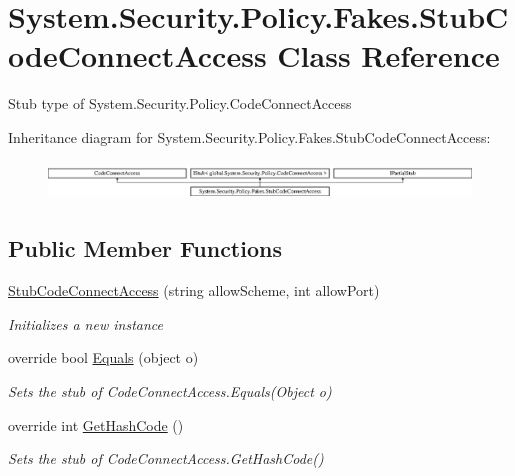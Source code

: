 \hypertarget{class_system_1_1_security_1_1_policy_1_1_fakes_1_1_stub_code_connect_access}{\section{System.\-Security.\-Policy.\-Fakes.\-Stub\-Code\-Connect\-Access Class Reference}
\label{class_system_1_1_security_1_1_policy_1_1_fakes_1_1_stub_code_connect_access}
}


Stub type of System.\-Security.\-Policy.\-Code\-Connect\-Access 


Inheritance diagram for System.\-Security.\-Policy.\-Fakes.\-Stub\-Code\-Connect\-Access\-:\begin{figure}[H]
\begin{center}
\leavevmode
\includegraphics[height=1.028466cm]{class_system_1_1_security_1_1_policy_1_1_fakes_1_1_stub_code_connect_access}
\end{center}
\end{figure}
\subsection*{Public Member Functions}
\begin{DoxyCompactItemize}
\item 
\hyperlink{class_system_1_1_security_1_1_policy_1_1_fakes_1_1_stub_code_connect_access_a382d588fe78c7bd2153528b23113f428}{Stub\-Code\-Connect\-Access} (string allow\-Scheme, int allow\-Port)
\begin{DoxyCompactList}\small\item\em Initializes a new instance\end{DoxyCompactList}\item 
override bool \hyperlink{class_system_1_1_security_1_1_policy_1_1_fakes_1_1_stub_code_connect_access_a24c4b0aca101d60f1c73cd0d936d871c}{Equals} (object o)
\begin{DoxyCompactList}\small\item\em Sets the stub of Code\-Connect\-Access.\-Equals(\-Object o)\end{DoxyCompactList}\item 
override int \hyperlink{class_system_1_1_security_1_1_policy_1_1_fakes_1_1_stub_code_connect_access_a59e9d663149eed10b887eeede1b3c3f6}{Get\-Hash\-Code} ()
\begin{DoxyCompactList}\small\item\em Sets the stub of Code\-Connect\-Access.\-Get\-Hash\-Code()\end{DoxyCompactList}\end{DoxyCompactItemize}
